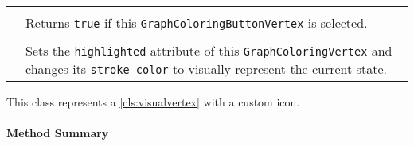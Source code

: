 \paragraph*{}
\begin{longtable}{Lp{10cm}}
	\startmethodtable
	 \\
	& Returns \texttt{true} if this \texttt{GraphColoringButtonVertex} is selected. \\
	 \\
	& Sets the \texttt{highlighted} attribute of this \texttt{GraphColoringVertex} and changes its \texttt{stroke color} to visually represent the current state. \\
	\hline
\end{longtable}

\pagebreak

This class represents a \ref{cls:visualvertex} with a custom icon. \\


\centerdash

\paragraph*{Method Summary}
